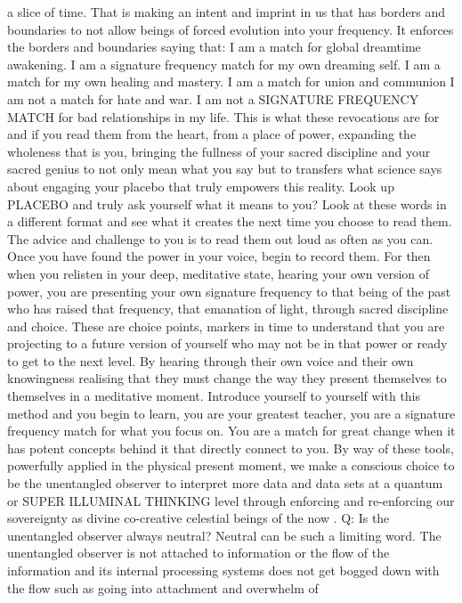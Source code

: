 a slice of time. That is making an intent and imprint in us that has
borders and boundaries to not allow beings of forced evolution into your
frequency. It enforces the borders and boundaries saying that: I am a
match for global dreamtime awakening. I am a signature frequency match
for my own dreaming self. I am a match for my own healing and mastery. I
am a match for union and communion I am not a match for hate and war. I
am not a SIGNATURE FREQUENCY MATCH for bad relationships in my life.
This is what these revocations are for and if you read them from the
heart, from a place of power, expanding the wholeness that is you,
bringing the fullness of your sacred discipline and your sacred genius
to not only mean what you say but to transfers what science says about
engaging your placebo that truly empowers this reality. Look up PLACEBO
and truly ask yourself what it means to you? Look at these words in a
different format and see what it creates the next time you choose to
read them. The advice and challenge to you is to read them out loud as
often as you can. Once you have found the power in your voice, begin to
record them. For then when you relisten in your deep, meditative state,
hearing your own version of power, you are presenting your own signature
frequency to that being of the past who has raised that frequency, that
emanation of light, through sacred discipline and choice. These are
choice points, markers in time to understand that you are projecting to
a future version of yourself who may not be in that power or ready to
get to the next level. By hearing through their own voice and their own
knowingness realising that they must change the way they present
themselves to themselves in a meditative moment. Introduce yourself to
yourself with this method and you begin to learn, you are your greatest
teacher, you are a signature frequency match for what you focus on. You
are a match for great change when it has potent concepts behind it that
directly connect to you. By way of these tools, powerfully applied in
the physical present moment, we make a conscious choice to be the
unentangled observer to interpret more data and data sets at a quantum
or SUPER ILLUMINAL THINKING level through enforcing and re-enforcing our
sovereignty as divine co-creative celestial beings of the now . Q: Is
the unentangled observer always neutral? Neutral can be such a limiting
word. The unentangled observer is not attached to information or the
flow of the information and its internal processing systems does not get
bogged down with the flow such as going into attachment and overwhelm of
